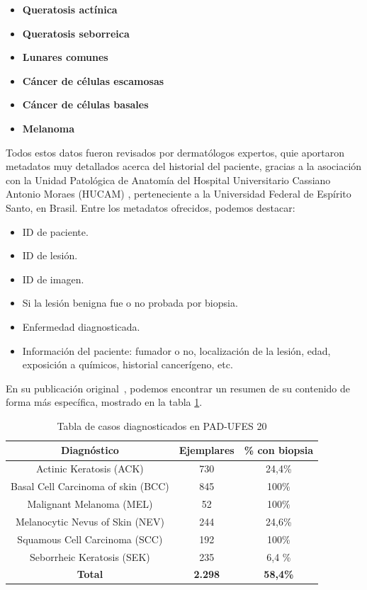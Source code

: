 \begin{itemize}
	\item \textbf{Queratosis actínica}
	\item \textbf{Queratosis seborreica}
	\item \textbf{Lunares comunes}
	\item \textbf{Cáncer de células escamosas}
	\item \textbf{Cáncer de células basales}
	\item \textbf{Melanoma}
	\end{itemize}

 Todos estos datos fueron revisados por dermatólogos expertos, quie aportaron metadatos muy detallados acerca del historial del paciente, gracias a la asociación con la Unidad Patológica de Anatomía del Hospital Universitario Cassiano Antonio Moraes (HUCAM) , perteneciente a la Universidad Federal de Espírito Santo, en Brasil. Entre los metadatos ofrecidos, podemos destacar:

\begin{itemize}
	\item ID de paciente.
	\item ID de lesión.
	\item ID de imagen.
	\item Si la lesión benigna fue o no probada por biopsia.
	\item Enfermedad diagnosticada.
	\item Información del paciente: fumador o no, localización de la lesión, edad, exposición a químicos, historial cancerígeno, etc.
\end{itemize}

En su publicación original~\cite{PACHECO2020106221}, podemos encontrar un resumen de su contenido de forma más específica, mostrado en la tabla \ref{tab:casospadufes}.

\begin{table}[!ht]
	\centering
	\begin{tabular}{|c|c|c|}
		\hline
		\textbf{Diagnóstico} & \textbf{Ejemplares} & \textbf{\% con biopsia} \\ \hline
		Actinic Keratosis (ACK) & 730 & 24,4\% \\ \hline
		Basal Cell Carcinoma of skin (BCC) & 845 & 100\% \\ \hline
		Malignant Melanoma (MEL) & 52 & 100\% \\ \hline
		Melanocytic Nevus of Skin (NEV) & 244 & 24,6\% \\ \hline
		Squamous Cell Carcinoma (SCC) & 192 & 100\% \\ \hline
		Seborrheic Keratosis (SEK)	&235	&6,4 \% \\ \hline
		\textbf{Total} & \textbf{2.298} & \textbf{58,4\%} \\ \hline
	\end{tabular}
	\caption{Tabla de casos diagnosticados en PAD-UFES 20}
	\label{tab:casospadufes}
\end{table}

